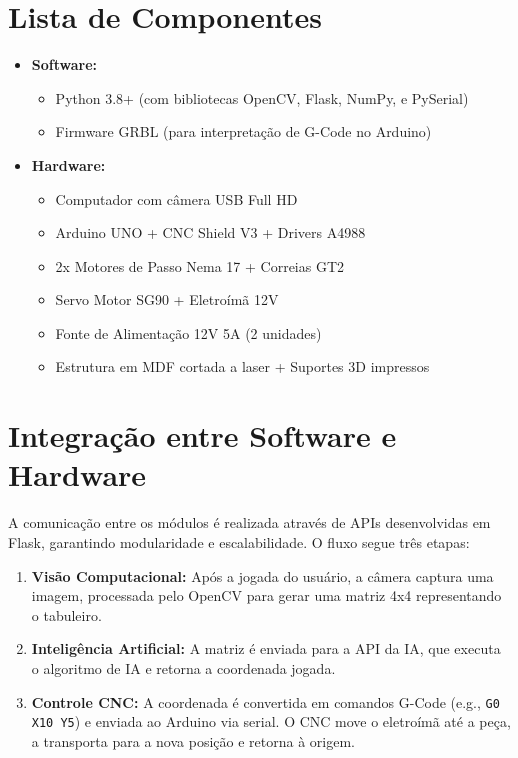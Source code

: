 \documentclass[a4paper,12pt]{article}
\begin{document}
\section{Lista de Componentes}
\begin{itemize}
    \item \textbf{Software:}
    \begin{itemize}
        \item Python 3.8+ (com bibliotecas OpenCV, Flask, NumPy, e PySerial)
        \item Firmware GRBL (para interpretação de G-Code no Arduino)
    \end{itemize}
    \item \textbf{Hardware:}
    \begin{itemize}
        \item Computador com câmera USB Full HD
        \item Arduino UNO + CNC Shield V3 + Drivers A4988
        \item 2x Motores de Passo Nema 17 + Correias GT2
        \item Servo Motor SG90 + Eletroímã 12V
        \item Fonte de Alimentação 12V 5A (2 unidades)
        \item Estrutura em MDF cortada a laser + Suportes 3D impressos
    \end{itemize}
\end{itemize}

\section{Integração entre Software e Hardware}
A comunicação entre os módulos é realizada através de APIs desenvolvidas em Flask, garantindo modularidade e escalabilidade. O fluxo segue três etapas:
\begin{enumerate}
    \item \textbf{Visão Computacional:} Após a jogada do usuário, a câmera captura uma imagem, processada pelo OpenCV para gerar uma matriz 4x4 representando o tabuleiro.
    \item \textbf{Inteligência Artificial:} A matriz é enviada para a API da IA, que executa o algoritmo de IA e retorna a coordenada jogada.
    \item \textbf{Controle CNC:} A coordenada é convertida em comandos G-Code (e.g., \texttt{G0 X10 Y5}) e enviada ao Arduino via serial. O CNC move o eletroímã até a peça, a transporta para a nova posição e retorna à origem.
\end{enumerate}
\end{document}
